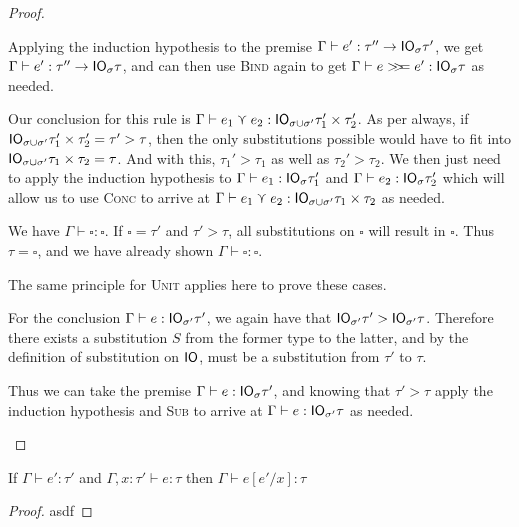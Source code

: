 \begin{proof}
\begin{description}
    Applying the induction hypothesis to the premise $\Gamma \vdash e' : \tau'' \rightarrow \mathsf{IO}_\sigma \tau'$,
    we get $\Gamma \vdash e' : \tau'' \rightarrow \mathsf{IO}_\sigma \tau$, and can then use \textsc{Bind}
    again to get $\Gamma \vdash e >\!\!>\!\!= e' : \mathsf{IO}_\sigma \tau$ as needed.
  \item[\textmd{\boxed{\textsc{Conc}}}]
    Our conclusion for this rule is $\Gamma \vdash e_1 \curlyvee e_2 : \mathsf{IO}_{\sigma \cup \sigma'} \tau_1'
    \times \tau_2'$. As per always, if $\mathsf{IO}_{\sigma \cup \sigma'} \tau_1' \times \tau_2' = \tau' > \tau$,
    then the only substitutions possible would have to fit into
    $\mathsf{IO}_{\sigma \cup \sigma'} \tau_1 \times \tau_2 = \tau$. And with this, $\tau_1' > \tau_1$ as well
    as $\tau_2' > \tau_2$. We then just need to apply the induction
    hypothesis to $\Gamma \vdash e_1 : \mathsf{IO}_\sigma \tau_1'$ and $\Gamma \vdash e_2 : \mathsf{IO}_\sigma \tau_2'$
    which will allow us to use \textsc{Conc} to arrive at $\Gamma \vdash e_1 \curlyvee
    e_2 : \mathsf{IO}_{\sigma \cup \sigma'} \tau_1 \times \tau_2$ as needed.
  \item[\textmd{\boxed{\textsc{Unit}}}]
    We have $\Gamma \vdash \square : \square$. If $\square = \tau'$ and $\tau' > \tau$, all
    substitutions on $\square$ will result in $\square$. Thus $\tau = \square$, and we
    have already shown $\Gamma \vdash \square : \square$.
  \item[\textmd{\boxed{\textsc{ReadFile}, \textsc{ReadNet}}}]
    The same principle for \textsc{Unit} applies here to prove these
    cases.
  \item[\textmd{\boxed{\textsc{Sub}}}]
    For the conclusion $\Gamma \vdash e : \mathsf{IO}_{\sigma'} \tau'$, we again have that
    $\mathsf{IO}_{\sigma'} \tau' > \mathsf{IO}_{\sigma'} \tau$. Therefore there exists a substitution $S$
    from the former type to the latter, and by the definition of
    substitution on $\mathsf{IO}$, must be a substitution from $\tau'$ to $\tau$.

    Thus we can take the premise $\Gamma \vdash e : \mathsf{IO}_\sigma \tau'$, and knowing that
    $\tau' > \tau$ apply the induction hypothesis and \textsc{Sub}
    to arrive at $\Gamma \vdash e : \mathsf{IO}_{\sigma'} \tau$ as needed.
  \end{description}
\end{proof}

\begin{lemma}
  If $\Gamma \vdash e' : \tau'$ and $\Gamma, x : \tau' \vdash e : \tau$ then $\Gamma \vdash e [e' / x] : \tau$
  \label{lemma:substitution}
\end{lemma}
\begin{proof}
  asdf
\end{proof}

